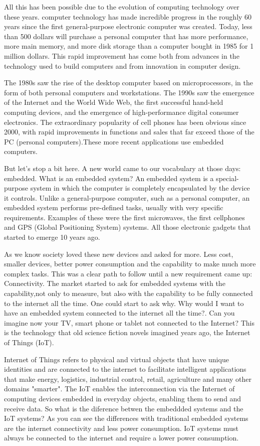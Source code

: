 All this has been possible due to the evolution of computing technology over
these years. computer technology has made incredible progress in the roughly 60
years since the first general-purpose electronic computer was created. Today,
less than 500 dollars  will purchase a personal computer that has more
performance, more main memory, and more disk storage than a computer bought in
1985 for 1 million dollars.\cite{Hennessy} This rapid improvement has come both
from advances in the technology used to build computers and from innovation in
computer design.

The 1980s saw the rise of the desktop computer based on microprocessors, in the
form of both personal computers and workstations. The 1990s saw the emergence
of the Internet and the World Wide Web, the first successful hand-held computing
devices, and the emergence of high-performance digital consumer electronics.
The extraordinary popularity of cell phones has been obvious since 2000, with
rapid improvements in functions and sales that far exceed those of the PC
(personal computers).These more recent applications use embedded computers.

But let's stop a bit here. A new world came to our vocabulary at those days:
embedded. What is an embedded system? An embedded system is a special-purpose
system in which the computer is completely encapsulated by the device it
controls.\cite{Hallinan} Unlike a general-purpose computer, such as a personal
computer, an embedded system performs pre-defined tasks, usually with very
specific requirements. Examples of these were the first microwaves, the first
cellphones and GPS (Global Positioning System) systems. All those electronic
gadgets that started to emerge 10 years ago.

As we know society loved these new devices and asked for more. Less cost,
smaller devices, better power consumption and the capability to make much more
complex tasks. This was a clear path to follow until a new requirement came up:
Connectivity. The market started to ask for embedded systems with the
capability,not only to measure, but also with the capability to be fully
connected to the internet all the time. One could start to ask why. Why would I
want to have an embedded system connected to the internet all the time?. Can
you imagine now your TV, smart phone or tablet not connected to the Internet?
This is the technology that old science fiction novels imagined years ago, the
Internet of Things (IoT).

Internet of Things refers to physical and virtual objects that have
unique identities and are connected to the internet to facilitate intelligent
applications that make energy, logistics, industrial control, retail,
agriculture and many other domains "smarter".\cite{Bahga} The IoT enables the
interconnection via the Internet of computing devices embedded in everyday
objects, enabling them to send and receive data. So what is the diference
betwen the embeddded systems and the IoT systems? As you can see the differences
with traditional embedded systems are the internet connectivity and less power
consumption. IoT systems must always be connected to the internet and require a
lower power consumption.

